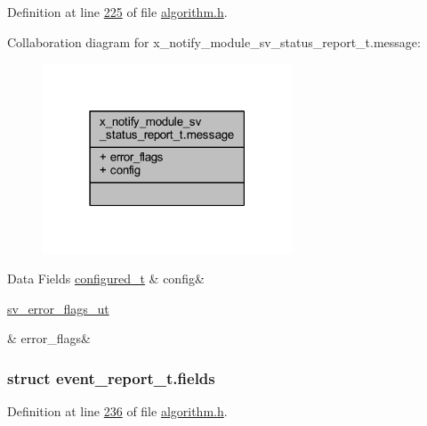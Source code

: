 Definition at line \hyperlink{a00021_source_l00225}{225} of file \hyperlink{a00021_source}{algorithm.\+h}.



Collaboration diagram for x\+\_\+notify\+\_\+module\+\_\+sv\+\_\+status\+\_\+report\+\_\+t.\+message\+:\nopagebreak
\begin{figure}[H]
\begin{center}
\leavevmode
\includegraphics[width=210pt]{db/d18/a00885}
\end{center}
\end{figure}
\begin{DoxyFields}{Data Fields}
\hypertarget{a00021_a2245023265ae4cf87d02c8b6ba991139}{\hyperlink{a00021_d6/d9c/a00352}{configured\+\_\+t}}\label{a00021_a2245023265ae4cf87d02c8b6ba991139}
&
config&
\\
\hline

\hypertarget{a00021_a4ed3e9e34123c42439def6c70a0960f8}{\hyperlink{a00022_d2/d5a/a00792}{sv\+\_\+error\+\_\+flags\+\_\+ut}}\label{a00021_a4ed3e9e34123c42439def6c70a0960f8}
&
error\+\_\+flags&
\\
\hline

\end{DoxyFields}
\label{db/d34/a00442}
\hypertarget{a00021_db/d34/a00442}{}
\subsubsection{struct event\+\_\+report\+\_\+t.\+fields}


Definition at line \hyperlink{a00021_source_l00236}{236} of file \hyperlink{a00021_source}{algorithm.\+h}.



